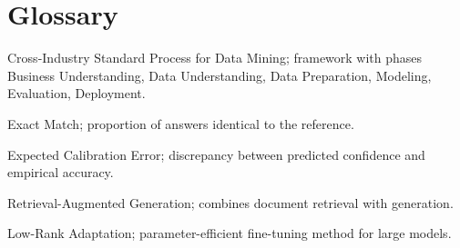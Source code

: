 \documentclass[12pt]{article}
\begin{document}
\section{Glossary}
\begin{description}[style=nextline]
    \item[CRISP-DM] Cross-Industry Standard Process for Data Mining; framework with phases Business Understanding, Data Understanding, Data Preparation, Modeling, Evaluation, Deployment.
    \item[EM] Exact Match; proportion of answers identical to the reference.
    \item[ECE] Expected Calibration Error; discrepancy between predicted confidence and empirical accuracy.
    \item[RAG] Retrieval-Augmented Generation; combines document retrieval with generation.
    \item[LoRA] Low-Rank Adaptation; parameter-efficient fine-tuning method for large models.
\end{description}
\end{document}
